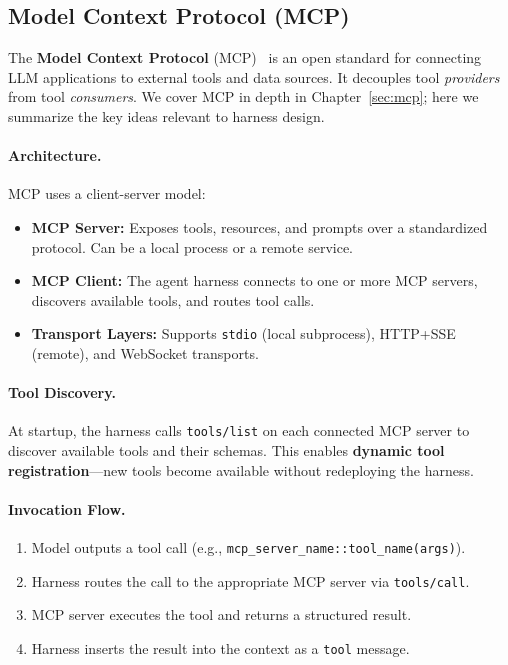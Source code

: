 \subsection{Model Context Protocol (MCP)}
\label{subsec:mcp}

The \textbf{Model Context Protocol} (MCP)~\cite{anthropic-mcp-2024} is an open standard for connecting LLM applications to external tools and data sources. It decouples tool \emph{providers} from tool \emph{consumers}. We cover MCP in depth in Chapter~\ref{sec:mcp}; here we summarize the key ideas relevant to harness design.

\paragraph{Architecture.}
\label{architecture.}

MCP uses a client-server model:

\begin{itemize}
  \item \textbf{MCP Server:} Exposes tools, resources, and prompts over a standardized protocol. Can be a local process or a remote service.
  \item \textbf{MCP Client:} The agent harness connects to one or more MCP servers, discovers available tools, and routes tool calls.
  \item \textbf{Transport Layers:} Supports \texttt{stdio} (local subprocess), HTTP+SSE (remote), and WebSocket transports.
\end{itemize}

\paragraph{Tool Discovery.}
\label{tool-discovery.}

At startup, the harness calls \texttt{tools/list} on each connected MCP server to discover available tools and their schemas. This enables \textbf{dynamic tool registration}---new tools become available without redeploying the harness.

\paragraph{Invocation Flow.}
\label{invocation-flow.}

\begin{enumerate}
  \item Model outputs a tool call (e.g., \texttt{mcp\_server\_name::tool\_name(args)}).
  \item Harness routes the call to the appropriate MCP server via \texttt{tools/call}.
  \item MCP server executes the tool and returns a structured result.
  \item Harness inserts the result into the context as a \texttt{tool} message.
\end{enumerate}

